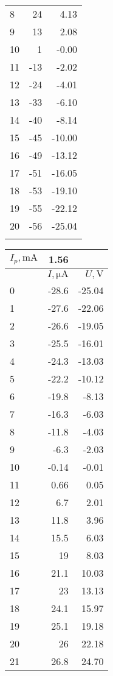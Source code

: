 \documentclass[12pt]{article}
\begin{document}
\begin{enumerate}
\begin{tabular}{|l|r|r|}
    8  &  24 &   4.13 \\
    9  &  13 &   2.08 \\
    10 &  1 &  -0.00 \\
    11 & -13 &  -2.02 \\
    12 & -24 &  -4.01 \\
    13 & -33 &  -6.10 \\
    14 & -40 &  -8.14 \\
    15 & -45 & -10.00 \\
    16 & -49 & -13.12 \\
    17 & -51 & -16.05 \\
    18 & -53 & -19.10 \\
    19 & -55 & -22.12 \\
    20 & -56 & -25.04 \\
    & &  \\
    \bottomrule
    \end{tabular}
    \begin{tabular}{l|r|r|}
    \toprule
    $I_p, \si{\milli \ampere}$ & 1.56 & \\
    \toprule
    {} &         $I, \si{\micro \ampere}$ & $U, \si{\volt} $\\
    \midrule
    0  & -28.6 & -25.04 \\
    1  & -27.6 & -22.06 \\
    2  & -26.6 & -19.05 \\
    3  & -25.5 & -16.01 \\
    4  & -24.3& -13.03 \\
    5  & -22.2 & -10.12 \\
    6  & -19.8 &  -8.13 \\
    7  & -16.3 &  -6.03 \\
    8  & -11.8 &  -4.03 \\
    9  & -6.3 &  -2.03 \\
    10 & -0.14 &  -0.01 \\
    11 &  0.66 &   0.05 \\
    12 &  6.7 &   2.01 \\
    13 &  11.8 &   3.96 \\
    14 &  15.5 &   6.03 \\
    15 &  19 &   8.03 \\
    16 &  21.1 &  10.03 \\
    17 &  23 &  13.13 \\
    18 &  24.1 &  15.97 \\
    19 &  25.1 &  19.18 \\
    20 &  26 &  22.18 \\
    21 &  26.8 &  24.70 \\
    \bottomrule
    \end{tabular}
    

\end{enumerate}
\end{document}
